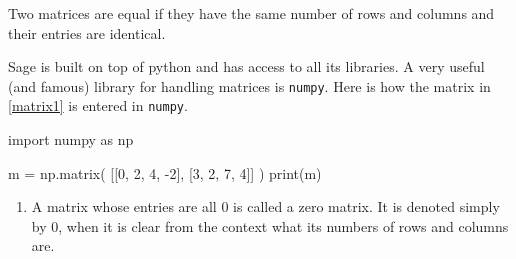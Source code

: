 \documentclass{article}
\begin{document}
Two matrices are equal if they have the same number of rows and columns and their entries are
identical.
 
Sage is built on top of python and has access to all its libraries. A
very useful (and famous) library for handling matrices is \texttt{numpy}. Here is how
the matrix in \eqref{matrix1} is entered in \texttt{numpy}.

\begin{sage}
import numpy as np
  
m = np.matrix( [[0, 2, 4, -2], [3, 2, 7, 4]] )
print(m)
\end{sage}


\begin{enumerate}

\item
  A matrix whose entries are all $0$ is called a zero matrix. It is denoted simply by $0$, when
  it is clear from the context what its numbers of rows and columns are.
  

\end{enumerate}
\end{document}
